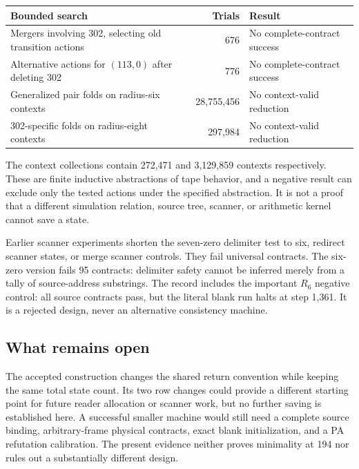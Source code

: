 \begin{center}\small
\begin{tabularx}{\linewidth}{@{}XrX@{}}
\toprule
Bounded search & Trials & Result\\\midrule
Mergers involving 302, selecting old transition actions
 & 676 & No complete-contract success\\
Alternative actions for $(113,0)$ after deleting 302
 & 776 & No complete-contract success\\
Generalized pair folds on radius-six contexts
 & 28,755,456 & No context-valid reduction\\
302-specific folds on radius-eight contexts
 & 297,984 & No context-valid reduction\\
\bottomrule
\end{tabularx}
\end{center}
The context collections contain 272,471 and 3,129,859 contexts
respectively. These are finite inductive abstractions of tape behavior,
and a negative result can exclude only the tested actions under the
specified abstraction. It is not a proof that a different simulation
relation, source tree, scanner, or arithmetic kernel cannot save a state.

Earlier scanner experiments shorten the seven-zero delimiter test to
six, redirect scanner states, or merge scanner controls. They fail
universal contracts. The six-zero version fails 95 contracts: delimiter
safety cannot be inferred merely from a tally of source-address
substrings. The record includes the important $R_6$ negative control:
all source contracts pass, but the literal blank run halts at step 1,361.
It is a rejected design, never an alternative consistency machine.

\subsection{What remains open}
The accepted construction changes the shared return convention while
keeping the same total state count. Its two row changes could provide a
different starting point for future reader allocation or scanner work,
but no further saving is established here. A successful smaller machine
would still need a complete source binding, arbitrary-frame physical
contracts, exact blank initialization, and a PA refutation calibration.
The present evidence neither proves minimality at 194 nor rules out
a substantially different design.
